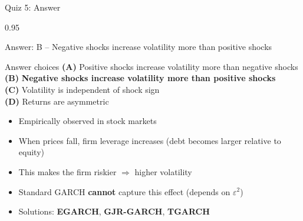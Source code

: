 \documentclass[9pt, aspectratio=169, t]{beamer}
\begin{document}
\begin{frame}{Quiz 5: Answer}
    \begin{cminipage}{0.95\textwidth}
    {\small
    \begin{exampleblock}{Answer: B -- Negative shocks increase volatility more than positive shocks}

    \vspace{0.1cm}

    \begin{block}{Answer choices}
        \textcolor{MainBlue}{\textbf{(A)}} Positive shocks increase volatility more than negative shocks \incorrect\\[2pt]
        \textcolor{MainBlue}{\textbf{(B)}} \textbf{\textcolor{Forest}{Negative shocks increase volatility more than positive shocks}} \correct\\[2pt]
        \textcolor{MainBlue}{\textbf{(C)}} Volatility is independent of shock sign \incorrect\\[2pt]
        \textcolor{MainBlue}{\textbf{(D)}} Returns are asymmetric \incorrect
    \end{block}

        \vspace{0.1cm}

        \begin{itemize}\setlength{\itemsep}{0pt}
            \item Empirically observed in stock markets
            \item When prices fall, firm leverage increases (debt becomes larger relative to equity)
            \item This makes the firm riskier $\Rightarrow$ higher volatility
            \item Standard GARCH \textbf{cannot} capture this effect (depends on $\varepsilon^2$)
            \item Solutions: \textbf{EGARCH}, \textbf{GJR-GARCH}, \textbf{TGARCH}
        \end{itemize}
    \end{exampleblock}
    }

    \end{cminipage}
\end{frame}
\end{document}
